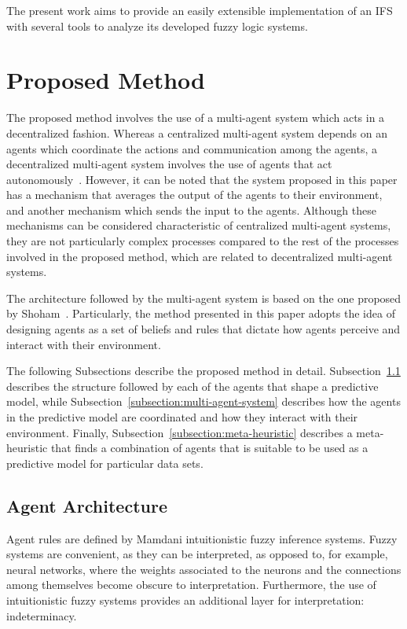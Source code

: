 \documentclass[review]{elsarticle}
\begin{document}
The present work aims to provide an easily extensible implementation of an IFS
with several tools to analyze its developed fuzzy logic systems.

\section{Proposed Method}
\label{section:proposed-method}

The proposed method involves the use of a multi-agent system which acts in a
decentralized fashion. Whereas a centralized multi-agent system depends on an
agents which coordinate the actions and communication among the agents, a
decentralized multi-agent system involves the use of agents that act
autonomously~\cite{andreadis2014classification}. However, it can be noted that
the system proposed in this paper has a mechanism that averages the output of
the agents to their environment, and another mechanism which sends the input to
the agents. Although these mechanisms can be considered characteristic of
centralized multi-agent systems, they are not particularly complex processes
compared to the rest of the processes involved in the proposed method, which are
related to decentralized multi-agent systems.

The architecture followed by the multi-agent system is based on the one proposed
by Shoham~\cite{Shoham1993}. Particularly, the method presented in this paper
adopts the idea of designing agents as a set of beliefs and rules that dictate
how agents perceive and interact with their environment.

The following Subsections describe the proposed method in
detail. Subsection~\ref{subsection:agent-rules} describes the structure
followed by each of the agents that shape a predictive model, while
Subsection~\ref{subsection:multi-agent-system} describes how the agents in the
predictive model are coordinated and how they interact with their
environment. Finally, Subsection~\ref{subsection:meta-heuristic} describes a
meta-heuristic that finds a combination of agents that is suitable to be used
as a predictive model for particular data sets.

\subsection{Agent Architecture}
\label{subsection:agent-rules}

Agent rules are defined by Mamdani intuitionistic fuzzy inference systems. Fuzzy systems
are convenient, as they can be interpreted, as opposed to, for example, neural
networks, where the weights associated to the neurons and the connections among
themselves become obscure to interpretation. Furthermore, the use of
intuitionistic fuzzy systems provides an additional layer for interpretation:
indeterminacy.
\end{document}
